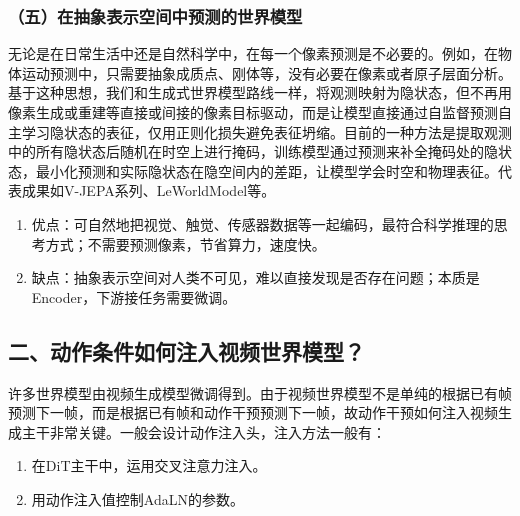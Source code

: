 \hypertarget{ux4e94ux5728ux62bdux8c61ux8868ux793aux7a7aux95f4ux4e2dux9884ux6d4bux7684ux4e16ux754cux6a21ux578b}{%
\subsubsection{（五）在抽象表示空间中预测的世界模型}\label{ux4e94ux5728ux62bdux8c61ux8868ux793aux7a7aux95f4ux4e2dux9884ux6d4bux7684ux4e16ux754cux6a21ux578b}}

无论是在日常生活中还是自然科学中，在每一个像素预测是不必要的。例如，在物体运动预测中，只需要抽象成质点、刚体等，没有必要在像素或者原子层面分析。基于这种思想，我们和生成式世界模型路线一样，将观测映射为隐状态，但不再用像素生成或重建等直接或间接的像素目标驱动，而是让模型直接通过自监督预测自主学习隐状态的表征，仅用正则化损失避免表征坍缩。目前的一种方法是提取观测中的所有隐状态后随机在时空上进行掩码，训练模型通过预测来补全掩码处的隐状态，最小化预测和实际隐状态在隐空间内的差距，让模型学会时空和物理表征。代表成果如V-JEPA系列、LeWorldModel等。

\begin{enumerate}
\def\labelenumi{\arabic{enumi}.}
\item
  优点：可自然地把视觉、触觉、传感器数据等一起编码，最符合科学推理的思考方式；不需要预测像素，节省算力，速度快。
\item
  缺点：抽象表示空间对人类不可见，难以直接发现是否存在问题；本质是Encoder，下游接任务需要微调。
\end{enumerate}

\hypertarget{ux4e8cux52a8ux4f5cux6761ux4ef6ux5982ux4f55ux6ce8ux5165ux89c6ux9891ux4e16ux754cux6a21ux578b}{%
\subsection{二、动作条件如何注入视频世界模型？}\label{ux4e8cux52a8ux4f5cux6761ux4ef6ux5982ux4f55ux6ce8ux5165ux89c6ux9891ux4e16ux754cux6a21ux578b}}

许多世界模型由视频生成模型微调得到。由于视频世界模型不是单纯的根据已有帧预测下一帧，而是根据已有帧和动作干预预测下一帧，故动作干预如何注入视频生成主干非常关键。一般会设计动作注入头，注入方法一般有：

\begin{enumerate}
\def\labelenumi{\arabic{enumi}.}
\item
  在DiT主干中，运用交叉注意力注入。
\item
  用动作注入值控制AdaLN的参数。
\end{enumerate}

